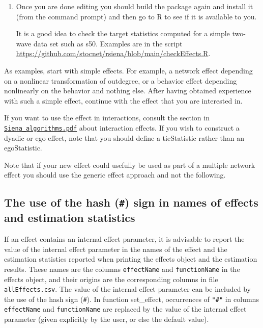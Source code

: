 \documentclass[a4paper,fleqn,11pt]{article}
\newcommand{\+}{\, + \,}
\newcommand{\sfn}[1]{\textsf{#1}}
\begin{document}
\begin{enumerate}
\begin{itemize}
                  We recommend opening any effect file to see
                  how the syntax works, but creating a new effect will be hard
                   without knowing at least a bit of C++.
            \item Add the name \textsf{NewEffect.cpp} to the file \textsf{sources.list}.
                  This is a long file without any hard returns.
                  Separation of filenames is by blanks.
                  It does not matter where you put it .
		\end{itemize}

		\item Once you are done editing you should build
the package again and install it (from the command prompt)
and then go to R to see if it is available to you.

It is a good idea to check the target statistics computed for a simple
two-wave data set such as \sfn{s50}.
Examples are in the script
\url{https://github.com/stocnet/rsiena/blob/main/checkEffects.R}.
\end{enumerate}

As examples, start with simple effects.
For example, a network effect depending on a nonlinear transformation
of outdegree, or a behavior effect depending nonlinearly
on the behavior and nothing else.
After having obtained experience with such a simple effect,
continue with the effect that you are interested in.
\medskip

If you want to use the effect in interactions, consult the section in
\href{http://www.stats.ox.ac.uk/~snijders/siena/Siena_algorithms.pdf}{\texttt{Siena\_algorithms.pdf}}
about interaction effects.
If you wish to construct a dyadic or ego effect, note that
you should define a \sfn{tieStatistic}
rather than an \sfn{egoStatistic}.
\medskip

Note that if your new effect could usefully be used as part of a multiple
network effect you should use the generic effect approach and not the following.

\subsection{The use of the hash (\texttt{\#}) sign
\protect \newline
in names of effects  and estimation statistics}
\label{S_hash}

If an effect contains an  internal effect parameter,
it is advisable to report the value of the internal effect parameter
in the names of the effect and the estimation statistics reported
when printing the effects object and the estimation results.
These names are the columns \texttt{effectName} and \texttt{functionName}
in the effects object, and their origins are the corresponding
columns in file \texttt{allEffects.csv}.
The value of the internal effect parameter can be included
by the use of the hash sign (\texttt{\#}).
In function \sfn{set\_effect}, occurrences of \texttt{"\#"}
in columns \texttt{effectName} and \texttt{functionName}
are replaced by the value of the internal effect parameter
(given explicitly by the user, or else the default value).
\end{document}
